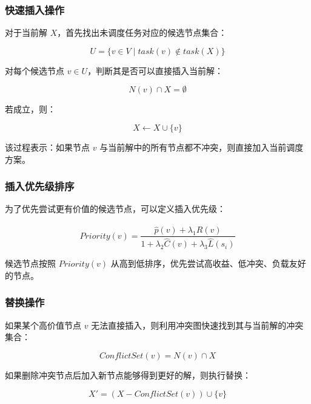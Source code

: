 \documentclass[UTF8,a4paper,12pt]{ctexart}
\begin{document}
\subsubsection{快速插入操作}

对于当前解 $X$，首先找出未调度任务对应的候选节点集合：

\begin{equation}
U=\{v\in V \mid task(v)\notin task(X)\}
\end{equation}

对每个候选节点 $v\in U$，判断其是否可以直接插入当前解：

\begin{equation}
N(v)\cap X=\emptyset
\end{equation}

若成立，则：

\begin{equation}
X\leftarrow X\cup\{v\}
\end{equation}

该过程表示：如果节点 $v$ 与当前解中的所有节点都不冲突，则直接加入当前调度方案。

\subsubsection{插入优先级排序}

为了优先尝试更有价值的候选节点，可以定义插入优先级：

\begin{equation}
Priority(v)=
\frac{\hat{p}(v)+\lambda_1\hat{R}(v)}
{1+\lambda_2\hat{C}(v)+\lambda_3\hat{L}(s_i)}
\end{equation}

候选节点按照 $Priority(v)$ 从高到低排序，优先尝试高收益、低冲突、负载友好的节点。

\subsubsection{替换操作}

如果某个高价值节点 $v$ 无法直接插入，则利用冲突图快速找到其与当前解的冲突集合：

\begin{equation}
ConflictSet(v)=N(v)\cap X
\end{equation}

如果删除冲突节点后加入新节点能够得到更好的解，则执行替换：

\begin{equation}
X'=(X-ConflictSet(v))\cup\{v\}
\end{equation}
\end{document}
